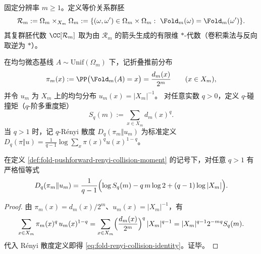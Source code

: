\begin{definition}[折叠等价关系群胚与群胚代数]\label{def:fold-equivalence-groupoid-algebra}
固定分辨率 \(m\ge 1\)。定义等价关系群胚
\[
\mathcal{R}_m:=\Omega_m\times_{X_m}\Omega_m
:=\{(\omega,\omega')\in\Omega_m\times\Omega_m:\ \Fold_m(\omega)=\Fold_m(\omega')\}.
\]
其复群胚代数 \(\CC[\mathcal{R}_m]\) 取为由 \(\mathcal{R}_m\) 的箭头生成的有限维 \(\ast\)-代数（卷积乘法与反向取逆为 \(\ast\)）。
\end{definition}

\begin{definition}\label{def:fold-pushforward-renyi-collision-moment}
在均匀微态基线 \(A\sim\mathrm{Unif}(\Omega_m)\) 下，记折叠推前分布
\[
\pi_m(x):=\PP\bigl(\Fold_m(A)=x\bigr)=\frac{d_m(x)}{2^m}\qquad(x\in X_m),
\]
并令 \(u_m\) 为 \(X_m\) 上的均匀分布 \(u_m(x)=|X_m|^{-1}\)。
对任意实数 \(q>0\)，定义 \(q\)-碰撞矩（\(q\)-阶多重度矩）
\[
S_q(m):=\sum_{x\in X_m} d_m(x)^q.
\]
当 \(q>1\) 时，记 \(q\)-Rényi 散度
\(
D_q(\pi_m\Vert u_m)
\)
为标准定义
\(
D_q(\pi\Vert u)=\frac{1}{q-1}\log\sum_x \pi(x)^q u(x)^{1-q}
\)。
\end{definition}

\begin{proposition}\label{prop:fold-renyi-collision-identity}
在定义 \ref{def:fold-pushforward-renyi-collision-moment} 的记号下，对任意 \(q>1\) 有严格恒等式
\begin{equation}\label{eq:fold-renyi-collision-identity}
D_q(\pi_m\Vert u_m)
=\frac{1}{q-1}\Bigl(\log S_q(m)-q\,m\log 2+(q-1)\log|X_m|\Bigr).
\end{equation}
\end{proposition}
\begin{proof}
由 \(\pi_m(x)=d_m(x)/2^m\)、\(u_m(x)=|X_m|^{-1}\)，有
\[
\sum_{x\in X_m}\pi_m(x)^q\,u_m(x)^{1-q}
=\sum_{x\in X_m}\Bigl(\frac{d_m(x)}{2^m}\Bigr)^q\,|X_m|^{q-1}
=|X_m|^{q-1}2^{-mq}S_q(m).
\]
代入 Rényi 散度定义即得 \eqref{eq:fold-renyi-collision-identity}。证毕。
\end{proof}

